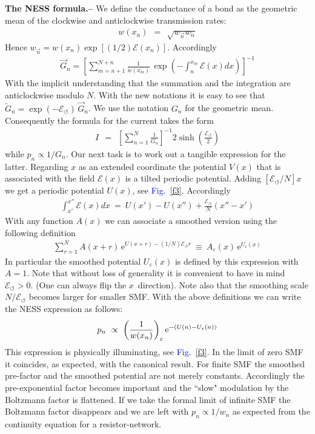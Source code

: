 \documentclass[aps,prl,floats,floatfix,twocolumn]{revtex4}
\newcommand{\eexp}{\mbox{e}^}
\newcommand{\mylabel}[1]{\label{#1}}
\newcommand{\beq}{\begin{eqnarray}}
\newcommand{\eeq}{\end{eqnarray}}
\newcommand{\be}[1]{\begin{eqnarray}\ifthenelse{#1=-1}
{\nonumber}{\ifthenelse{#1=0}{}{\mylabel{e#1}}}}
\newcommand{\sect}[1]{{\bf #1.-- }}
\newcommand{\Fig}[1]{\textcolor{blue}{Fig.}\!\!~\ref{#1}}
\begin{document}
\sect{The NESS formula}
%
%
We define the conductance of a bond as the geometric mean 
of the clockwise and anticlockwise transmission rates: 
%
\beq  
w(x_n) \ \ = \ \ \sqrt{ w_{\overrightarrow{n}} w_{\overleftarrow{n}} }
\eeq
%
Hence $w_{\overrightarrow{n}} = w(x_n) \exp[(1/2)\mathcal{E}(x_n)]$.
Accordingly 
%
%
\beq
\overrightarrow{G}_n = \left[ \sum_{m=n+1}^{N+n} \frac{1}{w(x_m)} 
\,\exp\left(-\int_{n}^{x_m} \!\!\!\mathcal{E}(x)dx \right) \right]^{-1} 
\eeq
%
With the implicit understanding that the summation and the integration 
are anticlockwise modulo $N$. With the new notations it is easy to see 
that ${\overleftarrow{G}_n = \exp(-\mathcal{E}_{\circlearrowleft}) \, \overrightarrow{G}_n}$.
We use the notation $G_n$ for the geometric mean. Consequently 
the formula for the current takes the form 
%
\beq
I \ \ = \ \ \left[\sum_{n=1}^N \frac{1}{G_n}\right]^{-1} 2\sinh\left(\frac{\mathcal{E}_{\circlearrowleft}}{2}\right)
\eeq 
%
while $p_n\propto 1/G_n$. Our next task is to work out a tangible 
expression for the latter. Regarding $x$ as an extended coordinate 
the potential $V(x)$ that is associated with the field $\mathcal{E}(x)$ 
is a tilted periodic potential. Adding $[\mathcal{E}_{\circlearrowleft}/N] x$
we get a periodic potential $U(x)$, see \Fig{f3}. Accordingly 
%
\beq
\int_{x'}^{x''} \!\!\!\mathcal{E}(x)dx \ = \ U(x'){-}U(x'') + \frac{\mathcal{E}_{\circlearrowleft}}{N}(x''{-}x')
\eeq  
%
With any function $A(x)$ we can associate a smoothed version 
using the following definition  
%
\beq
\sum_{r=1}^N A(x{+}r) \, \eexp{U(x{+}r)- (1/N)\mathcal{E}_{\circlearrowleft}r} \ \equiv \ A_{\varepsilon}(x) \, \eexp{U_{\varepsilon}(x)} 
\eeq
%
In particular the smoothed potential $U_{\varepsilon}(x)$ is defined by this expression with ${A=1}$. 
Note that without loss of generality it is convenient to have 
in mind ${\mathcal{E}_{\circlearrowleft}>0}$. (One can always flip the $x$~direction).  
Note also that the smoothing scale $N/\mathcal{E}_{\circlearrowleft}$ becomes larger for smaller SMF.
With the above definitions we can write the NESS expression as follows:
%
\be{17}
p_n \ \propto \ \left( \frac{1}{w(x_n)} \right)_{\varepsilon} \eexp{-(U(n)-U_{\varepsilon}(n))}
\eeq
%
This expression is physically illuminating, see \Fig{f3}. 
In the limit of zero SMF it coincides, as expected, with the canonical result. 
For finite SMF the smoothed pre-factor and the smoothed potential
are not merely constants. Accordingly the pre-exponential factor
becomes important and the ``slow" modulation by the Boltzmann factor 
is flattened. If we take the formal limit of infinite SMF 
the Boltzmann factor disappears and we are left with ${p_n \propto 1/w_n}$    
as expected from the continuity equation for a resistor-network. 
\end{document}
